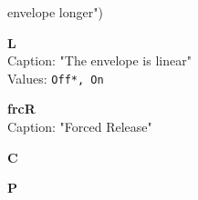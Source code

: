 \documentclass[
 11pt,
 twoside,
 a4paper,
 headinclude,
 footinclude,
 final                                 %
]{article}
\begin{document}
\begin{enumber}
\begin{enumber}
\begin{enumber}
\begin{enumber}
\begin{enumber}
\begin{enumber}
\begin{enumber}
                              envelope longer")
                        \item \textbf{L} \\
                           Caption: "The envelope is linear" \\
                           Values: \texttt{Off*, On}
                        \item \textbf{frcR} \\
                           Caption: "Forced Release"
                     \end{enumber}
                     \item \textbf{C}
                     \item \textbf{P}
                  \end{enumber}
            \end{enumber}



\end{enumber}
\end{enumber}
\end{enumber}
\end{enumber}
\end{document}
